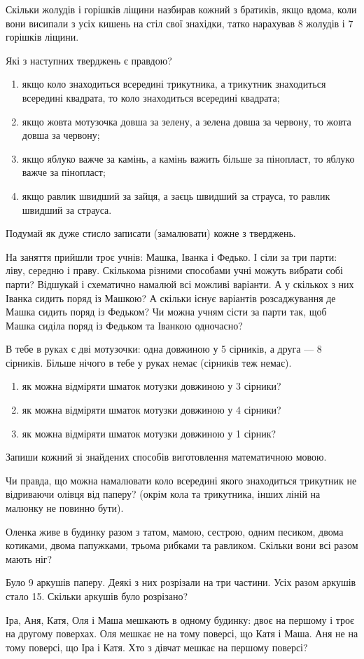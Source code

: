 Скільки жолудів і горішків ліщини назбирав кожний з братиків,
якщо вдома, коли вони висипали з усіх кишень на стіл свої знахідки,
татко нарахував 8 жолудів і 7 горішків ліщини.


\problem
Які з наступних тверджень є правдою?
\begin{enumerate}
    \item якщо коло знаходиться всередині трикутника,
    а трикутник знаходиться всередині квадрата,
    то коло знаходиться всередині квадрата;
    \item якщо жовта мотузочка довша за зелену,
    а зелена довша за червону, то жовта довша за червону;
    \item якщо яблуко важче за камінь, а камінь важить більше за пінопласт,
    то яблуко важче за пінопласт;
    \item якщо равлик швидший за зайця, а заєць швидший за страуса,
    то равлик швидший за страуса.
\end{enumerate}
Подумай як дуже стисло записати (замалювати) кожне з тверджень.


\problem
На заняття прийшли троє учнів: Машка, Іванка і Федько.
І сіли за три парти: ліву, середню і праву.
Скількома різними способами учні можуть вибрати собі парти?
Відшукай і схематично намалюй всі можливі варіанти.
А у скількох з них Іванка сидить поряд із Машкою?
А скільки існує варіантів розсаджування де Машка сидить поряд із Федьком?
Чи можна учням сісти за парти так,
щоб Машка сиділа поряд із Федьком та Іванкою одночасно?



\problem
В тебе в руках є дві мотузочки:
одна довжиною у 5 сірників, а друга --- 8 сірників.
Більше нічого в тебе у руках немає (сірників теж немає).
\begin{enumerate}
    \item як можна відміряти шматок мотузки довжиною у 3 сірники?
    \item як можна відміряти шматок мотузки довжиною у 4 сірники?
    \item як можна відміряти шматок мотузки довжиною у 1 сірник?
\end{enumerate}
Запиши кожний зі знайдених способів виготовлення математичною мовою.


\problem
Чи правда, що можна намалювати коло всередині якого знаходиться
трикутник не відриваючи олівця від паперу?
(окрім кола та трикутника, інших ліній на малюнку не повинно бути).


\problem
Оленка живе в будинку разом з татом, мамою, сестрою, одним песиком,
двома котиками, двома папужками, трьома рибками та равликом.
Скільки вони всі разом мають ніг?


\problem
Було 9 аркушів паперу. Деякі з них розрізали на три частини.
Усіх разом аркушів стало 15.
Скільки аркушів було розрізано?


\problem
Іра, Аня, Катя, Оля і Маша мешкають в одному будинку:
двоє на першому і троє на другому поверхах.
Оля мешкає не на тому поверсі, що Катя і Маша.
Аня не на тому поверсі, що Іра і Катя.
Хто з дівчат мешкає на першому поверсі?
